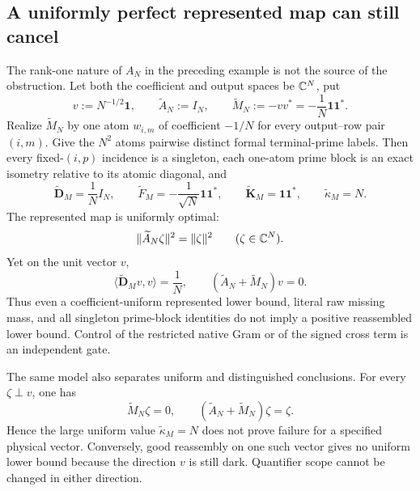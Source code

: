 \subsection{A uniformly perfect represented map can still cancel}

The rank-one nature of \(A_N\) in the preceding example is not the source
of the obstruction.  Let both the coefficient and output spaces be
\(\mathbb C^N\), put
\begin{equation}
 v:=N^{-1/2}\boldsymbol 1,
 \qquad
 \widetilde A_N:=I_N,
 \qquad
 \widetilde M_N:=-vv^*=-\frac1N
 \boldsymbol 1\boldsymbol 1^*.
 \label{eq:tpc62-uniform-represented-model}
\end{equation}
Realize \(\widetilde M_N\) by one atom \(w_{i,m}\) of coefficient
\(-1/N\) for every output--row pair \((i,m)\).  Give the \(N^2\) atoms
pairwise distinct formal terminal-prime labels.  Then every
fixed-\((i,p)\) incidence is a singleton, each one-atom prime block is an
exact isometry relative to its atomic diagonal, and
\begin{equation}
 \widetilde{\mathbf D}_M=\frac1N I_N,
 \qquad
 \widetilde F_M=-\frac1{\sqrt N}
 \boldsymbol 1\boldsymbol 1^*,
 \qquad
 \widetilde{\mathbf K}_M=\boldsymbol 1\boldsymbol 1^*,
 \qquad
 \widetilde\kappa_M=N.
 \label{eq:tpc62-uniform-model-gram}
\end{equation}
The represented map is uniformly optimal:
\begin{equation}
 \|\widetilde A_N\zeta\|^2=\|\zeta\|^2
 \qquad(\zeta\in\mathbb C^N).
 \label{eq:tpc62-uniform-perfect-represented}
\end{equation}
Yet on the unit vector \(v\),
\begin{equation}
 \langle\widetilde{\mathbf D}_Mv,v\rangle=\frac1N,
 \qquad
 (\widetilde A_N+\widetilde M_N)v=0.
 \label{eq:tpc62-uniform-model-cancellation}
\end{equation}
Thus even a coefficient-uniform represented lower bound, literal raw
missing mass, and all singleton prime-block identities do not imply a
positive reassembled lower bound.  Control of the restricted native Gram
or of the signed cross term is an independent gate.

The same model also separates uniform and distinguished conclusions.  For
every \(\zeta\perp v\), one has
\begin{equation}
 \widetilde M_N\zeta=0,
 \qquad
 (\widetilde A_N+\widetilde M_N)\zeta=\zeta.
 \label{eq:tpc62-uniform-model-good-directions}
\end{equation}
Hence the large uniform value \(\widetilde\kappa_M=N\) does not prove
failure for a specified physical vector.  Conversely, good reassembly on
one such vector gives no uniform lower bound because the direction \(v\)
is still dark.  Quantifier scope cannot be changed in either direction.

